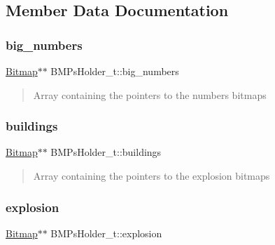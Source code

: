 \subsection{Member Data Documentation}
\hypertarget{struct_b_m_ps_holder__t_a5c1aac4b756c7caaadd1e857cc168c3a}{}\label{struct_b_m_ps_holder__t_a5c1aac4b756c7caaadd1e857cc168c3a} 
\subsubsection{\texorpdfstring{big\+\_\+numbers}{big\_numbers}}
{\footnotesize\ttfamily \hyperlink{struct_bitmap}{Bitmap}$\ast$$\ast$ B\+M\+Ps\+Holder\+\_\+t\+::big\+\_\+numbers}



\begin{quote}
Array containing the pointers to the numbers bitmaps \end{quote}


\hypertarget{struct_b_m_ps_holder__t_a71756da7b641decbe1333acdb01b05ee}{}\label{struct_b_m_ps_holder__t_a71756da7b641decbe1333acdb01b05ee} 
\subsubsection{\texorpdfstring{buildings}{buildings}}
{\footnotesize\ttfamily \hyperlink{struct_bitmap}{Bitmap}$\ast$$\ast$ B\+M\+Ps\+Holder\+\_\+t\+::buildings}



\begin{quote}
Array containing the pointers to the explosion bitmaps \end{quote}


\hypertarget{struct_b_m_ps_holder__t_adf9a39188fb506844694ba403d97e4a1}{}\label{struct_b_m_ps_holder__t_adf9a39188fb506844694ba403d97e4a1} 
\subsubsection{\texorpdfstring{explosion}{explosion}}
{\footnotesize\ttfamily \hyperlink{struct_bitmap}{Bitmap}$\ast$$\ast$ B\+M\+Ps\+Holder\+\_\+t\+::explosion}



